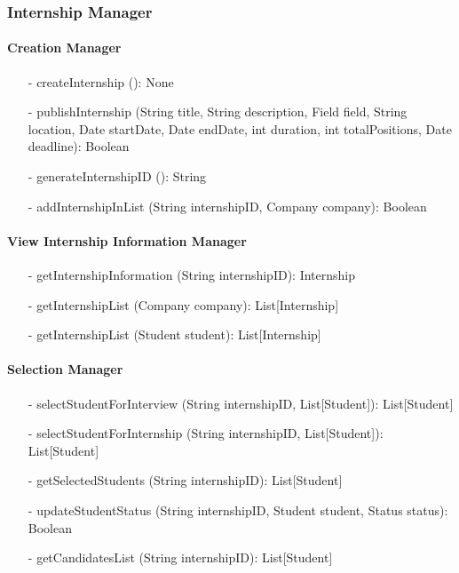 \subsubsection{Internship Manager}
\paragraph{Creation Manager}
\begin{itemize}
    \item[-] createInternship (): None
    \item[-] publishInternship (String title, String description, Field field, String location, Date startDate, Date endDate, int duration, int totalPositions, Date deadline): Boolean
    \item[-] generateInternshipID (): String
    \item[-] addInternshipInList (String internshipID, Company company): Boolean
\end{itemize}

\paragraph{View Internship Information Manager}
\begin{itemize}
    \item[-] getInternshipInformation (String internshipID): Internship
    \item[-] getInternshipList (Company company): List[Internship]
    \item[-] getInternshipList (Student student): List[Internship]
\end{itemize}

\paragraph{Selection Manager}
\begin{itemize}
    \item[-] selectStudentForInterview (String internshipID, List[Student]): List[Student]
    \item[-] selectStudentForInternship (String internshipID, List[Student]): List[Student]
    \item[-] getSelectedStudents (String internshipID): List[Student]
    \item[-] updateStudentStatus (String internshipID, Student student, Status status): Boolean
    \item[-] getCandidatesList (String internshipID): List[Student]
\end{itemize}

